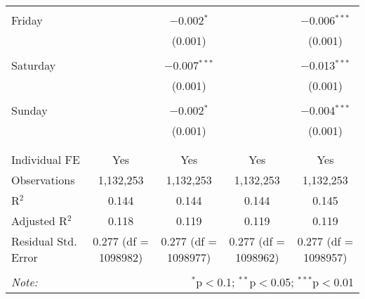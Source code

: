 \documentclass[
]{article}
\begin{document}
\begin{table}[!htbp]
{\begin{tabular}{@{\extracolsep{5pt}}lcccc}
  & & & & \\ 
 Friday &  & $-$0.002$^{*}$ &  & $-$0.006$^{***}$ \\ 
  &  & (0.001) &  & (0.001) \\ 
  & & & & \\ 
 Saturday &  & $-$0.007$^{***}$ &  & $-$0.013$^{***}$ \\ 
  &  & (0.001) &  & (0.001) \\ 
  & & & & \\ 
 Sunday &  & $-$0.002$^{*}$ &  & $-$0.004$^{***}$ \\ 
  &  & (0.001) &  & (0.001) \\ 
  & & & & \\ 
\hline \\[-1.8ex] 
Individual FE & Yes & Yes & Yes & Yes \\ 
Observations & 1,132,253 & 1,132,253 & 1,132,253 & 1,132,253 \\ 
R$^{2}$ & 0.144 & 0.144 & 0.144 & 0.145 \\ 
Adjusted R$^{2}$ & 0.118 & 0.119 & 0.119 & 0.119 \\ 
Residual Std. Error & 0.277 (df = 1098982) & 0.277 (df = 1098977) & 0.277 (df = 1098962) & 0.277 (df = 1098957) \\ 
\hline 
\hline \\[-1.8ex] 
\textit{Note:}  & \multicolumn{4}{r}{$^{*}$p$<$0.1; $^{**}$p$<$0.05; $^{***}$p$<$0.01} \\ 
\end{tabular}
} 
\end{table}
\end{document}
